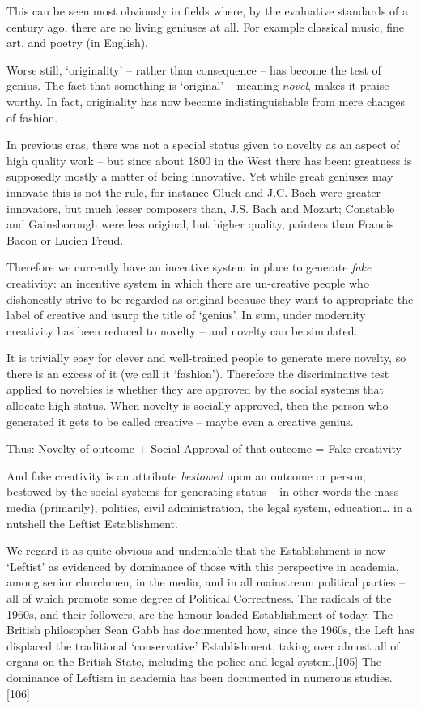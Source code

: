 \documentclass[
]{book}
\begin{document}
This can be seen most obviously in fields where, by the evaluative standards of a century ago, there are no living geniuses at all. For example classical music, fine art, and poetry (in English).

Worse still, `originality' -- rather than consequence -- has become the test of genius. The fact that something is `original' -- meaning \emph{novel}, makes it praise-worthy. In fact, originality has now become indistinguishable from mere changes of fashion.

In previous eras, there was not a special status given to novelty as an aspect of high quality work -- but since about 1800 in the West there has been: greatness is supposedly mostly a matter of being innovative. Yet while great geniuses may innovate this is not the rule, for instance Gluck and J.C. Bach were greater innovators, but much lesser composers than, J.S. Bach and Mozart; Constable and Gainsborough were less original, but higher quality, painters than Francis Bacon or Lucien Freud.

Therefore we currently have an incentive system in place to generate \emph{fake} creativity: an incentive system in which there are un-creative people who dishonestly strive to be regarded as original because they want to appropriate the label of creative and usurp the title of `genius'. In sum, under modernity creativity has been reduced to novelty -- and novelty can be simulated.

It is trivially easy for clever and well-trained people to generate mere novelty, so there is an excess of it (we call it `fashion'). Therefore the discriminative test applied to novelties is whether they are approved by the social systems that allocate high status. When novelty is socially approved, then the person who generated it gets to be called creative -- maybe even a creative genius.

Thus: Novelty of outcome + Social Approval of that outcome = Fake creativity

And fake creativity is an attribute \emph{bestowed} upon an outcome or person; bestowed by the social systems for generating status -- in other words the mass media (primarily), politics, civil administration, the legal system, education\ldots{} in a nutshell the Leftist Establishment.

We regard it as quite obvious and undeniable that the Establishment is now `Leftist' as evidenced by dominance of those with this perspective in academia, among senior churchmen, in the media, and in all mainstream political parties -- all of which promote some degree of Political Correctness. The radicals of the 1960s, and their followers, are the honour-loaded Establishment of today. The British philosopher Sean Gabb has documented how, since the 1960s, the Left has displaced the traditional `conservative' Establishment, taking over almost all of organs on the British State, including the police and legal system.{[}105{]} The dominance of Leftism in academia has been documented in numerous studies.{[}106{]}
\end{document}
